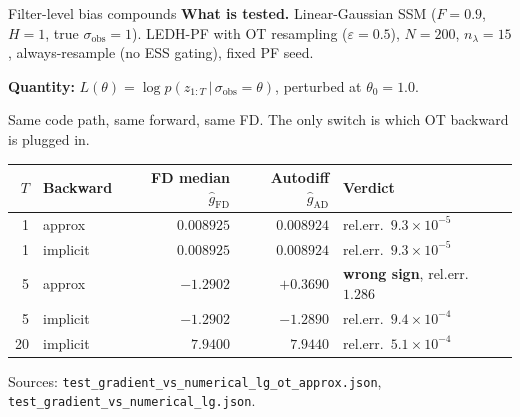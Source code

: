 \documentclass[10pt,aspectratio=169]{beamer}
\newcommand{\given}{\,|\,}
\begin{document}
\begin{frame}{Filter-level bias compounds}
  \textbf{What is tested.} Linear-Gaussian SSM ($F{=}0.9$, $H{=}1$, true $\sigma_\text{obs}{=}1$). LEDH-PF with OT resampling ($\varepsilon{=}0.5$), $N{=}200$, $n_\lambda{=}15$, always-resample (no ESS gating), fixed PF seed.

  \medskip
  \textbf{Quantity:} $L(\theta) = \log p(z_{1:T}\given \sigma_\text{obs}{=}\theta)$, perturbed at $\theta_0 = 1.0$.

  \medskip
  Same code path, same forward, same FD. The only switch is which OT backward is plugged in.

  \medskip
  \begin{center}
  \footnotesize
  \begin{tabular}{r l r r l}
    \toprule
    $T$ & Backward & FD median $\widehat{g}_\text{FD}$ & Autodiff $\widehat{g}_\text{AD}$ & Verdict \\
    \midrule
    1  & approx   & $\phantom{-}0.008925$ & $\phantom{-}0.008924$ & rel.err.\ $9.3{\times}10^{-5}$ \\
    1  & implicit & $\phantom{-}0.008925$ & $\phantom{-}0.008924$ & rel.err.\ $9.3{\times}10^{-5}$ \\
    \midrule
    \rowcolor{red!15}
    5  & approx   & $-1.2902$              & $\phantom{-}\mathbf{+0.3690}$ & \textbf{wrong sign}, rel.err.\ $1.286$ \\
    5  & implicit & $-1.2902$              & $-1.2890$             & rel.err.\ $9.4{\times}10^{-4}$ \\
    \midrule
    20 & implicit & $\phantom{-}7.9400$    & $\phantom{-}7.9440$   & rel.err.\ $5.1{\times}10^{-4}$ \\
    \bottomrule
  \end{tabular}
  \end{center}

  \medskip
  \footnotesize Sources: \texttt{test\_gradient\_vs\_numerical\_lg\_ot\_approx.json}, \texttt{test\_gradient\_vs\_numerical\_lg.json}.
\end{frame}
\end{document}
